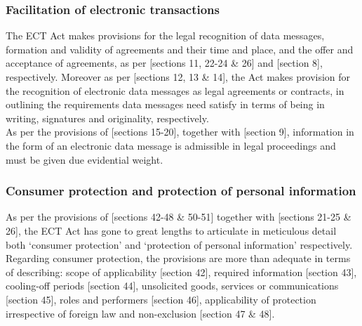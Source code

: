 \documentclass[11pt]{article}
\begin{document}
\subsubsection{Facilitation of electronic transactions}
\label{sec:org0679e14}
The ECT Act \cite{rsa02_elect_comm_trans_act} makes provisions for the legal
recognition of data messages, formation and validity of agreements and their
time and place, and the offer and acceptance of agreements, as per [sections 11,
22-24 \& 26]\cite{rsa02_elect_comm_trans_act} and [section
8]\cite{rsa12_elect_comm_trans_amend_bill}, respectively. Moreover as per
[sections 12, 13 \& 14]\cite{rsa02_elect_comm_trans_act}, the Act makes provision
for the recognition of electronic data messages as legal agreements or
contracts, in outlining the requirements data messages need satisfy in terms of
being in writing, signatures and originality, respectively.\\

As per the provisions of [sections 15-20]\cite{rsa02_elect_comm_trans_act}, together
with [section 9]\cite{rsa12_elect_comm_trans_amend_bill}, information in the form
of an electronic data message is admissible in legal proceedings and must be
given due evidential weight.

\subsubsection{Consumer protection and protection of personal information}
\label{sec:orgc3823c5}
As per the provisions of [sections 42-48 \& 50-51]\cite{rsa02_elect_comm_trans_act}
together with [sections 21-25 \& 26]\cite{rsa12_elect_comm_trans_amend_bill}, the
ECT Act \cite{rsa02_elect_comm_trans_act} has gone to great lengths to articulate
in meticulous detail both `consumer protection' and `protection of personal
information' respectively.\\

Regarding consumer protection, the provisions are more than adequate in terms of
describing: scope of applicability [section 42]\cite{rsa02_elect_comm_trans_act},
required information [section 43]\cite{rsa02_elect_comm_trans_act}, cooling-off
periods [section 44]\cite{rsa02_elect_comm_trans_act}, unsolicited goods, services
or communications [section 45]\cite{rsa02_elect_comm_trans_act}, roles and
performers [section 46]\cite{rsa02_elect_comm_trans_act}, applicability of
protection irrespective of foreign law and non-exclusion [section 47 \&
48]\cite{rsa02_elect_comm_trans_act}.\\
\end{document}
